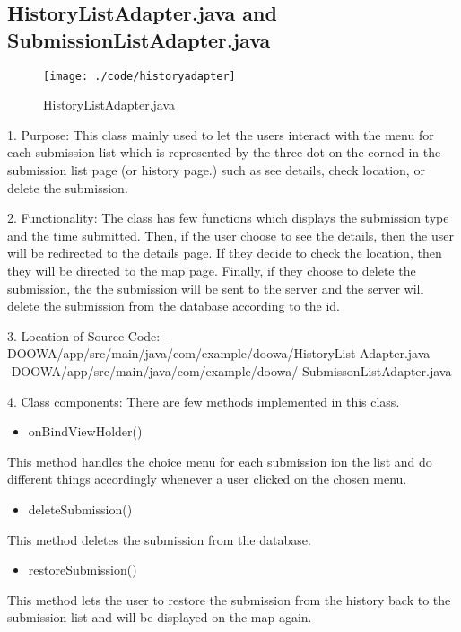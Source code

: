 \documentclass[conference]{IEEEtran}
\begin{document}
\subsection{HistoryListAdapter.java and SubmissionListAdapter.java}
\begin{figure}[h!]
\texttt{[image: ./code/historyadapter]}
\centering
\caption{HistoryListAdapter.java}
\end{figure}
1. Purpose: This class mainly used to let the users interact with the menu for each submission list which is represented by the three dot on the corned in the submission list page (or history page.) such as see details, check location, or delete the submission.\break
\par 2. Functionality: The class has few functions which displays the submission type and the time submitted. Then, if the user choose to see the details, then the user will be redirected to the details page. If they decide to check the location, then they will be directed to the map page. Finally, if they choose to delete the submission, the the submission will be sent to the server and the server will delete the submission from the database according to the id.\break

3. Location of Source Code: -DOOWA/app/src/main/java/com/example/doowa/HistoryList Adapter.java\\
-DOOWA/app/src/main/java/com/example/doowa/ SubmissonListAdapter.java
\break

4. Class components: There are few methods implemented in this class.
\begin{itemize}
\item onBindViewHolder()
\end{itemize}
This method handles the choice menu for each submission ion the list and do different things accordingly whenever a user clicked on the chosen menu.
\begin{itemize}
\item deleteSubmission()
\end{itemize}
This method deletes the submission from the database.
\begin{itemize}
\item restoreSubmission()
\end{itemize}
This method lets the user to restore the submission from the history back to the submission list and will be displayed on the map again.
\break
\end{document}
